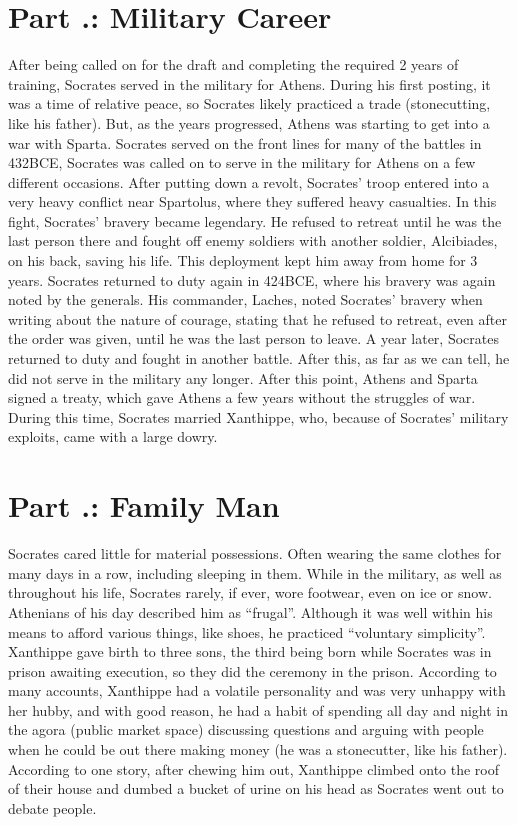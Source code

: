\section{Part \thechapcount.\theseccount: Military Career}

After being called on for the draft and completing the required 2 years of training, Socrates served in the military for Athens. During his first posting, it was a time of relative peace, so Socrates likely practiced a trade (stonecutting, like his father). But, as the years progressed, Athens was starting to get into a war with Sparta. Socrates served on the front lines for many of the battles in 432BCE,  Socrates was called on to serve in the military for Athens on a few different occasions. After putting down a revolt, Socrates' troop entered into a very heavy conflict near Spartolus, where they suffered heavy casualties. In this fight, Socrates' bravery became legendary. He refused to retreat until he was the last person there and fought off enemy soldiers with another soldier, Alcibiades, on his back, saving his life. This deployment kept him away from home for 3 years. Socrates returned to duty again in 424BCE, where his bravery was again noted by the generals. His commander, Laches, noted Socrates' bravery when writing about the nature of courage, stating that he refused to retreat, even after the order was given, until he was the last person to leave. A year later, Socrates returned to duty and fought in another battle. After this, as far as we can tell, he did not serve in the military any longer. After this point, Athens and Sparta signed a treaty, which gave Athens a few years without the struggles of war. During this time, Socrates married Xanthippe, who, because of Socrates' military exploits, came with a large dowry.
\section{Part \thechapcount.\theseccount: Family Man}

Socrates cared little for material possessions. Often wearing the same clothes for many days in a row, including sleeping in them. While in the military, as well as throughout his life, Socrates rarely, if ever, wore footwear, even on ice or snow. Athenians of his day described him as “frugal”. Although it was well within his means to afford various things, like shoes, he practiced “voluntary simplicity”. Xanthippe gave birth to three sons, the third being born while Socrates was in prison awaiting execution, so they did the ceremony in the prison. According to many accounts, Xanthippe had a volatile personality and was very unhappy with her hubby, and with good reason, he had a habit of spending all day and night in the agora (public market space) discussing questions and arguing with people when he could be out there making money (he was a stonecutter, like his father). According to one story, after chewing him out, Xanthippe climbed onto the roof of their house and dumbed a bucket of urine on his head as Socrates went out to debate people.

